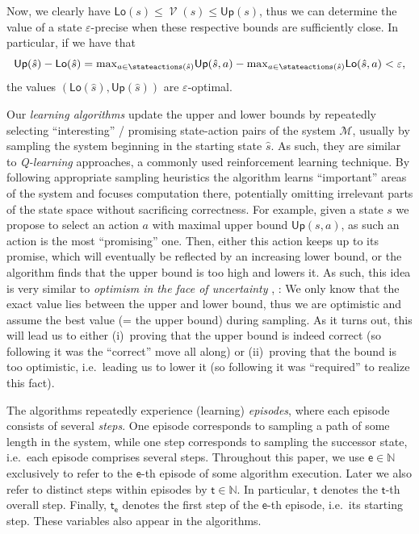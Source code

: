\documentclass{theoretics}
\newcommand{\Naturals}{\mathbb{N}}
\newcommand{\MDP}{\mathcal{M}}
\newcommand{\initialstate}{\hat{s}}
\DeclareMathOperator{\val}{\mathcal{V}}
\newcommand{\upperbound}{\mathsf{Up}}
\newcommand{\lowerbound}{\mathsf{Lo}}
\newcommand{\algostep}{\mathsf{t}}
\newcommand{\algoepisode}{\mathsf{e}}
\begin{document}
Now, we clearly have  $\lowerbound(s) \leq \val(s) \leq \upperbound(s)$, thus we can determine the value of a state $\varepsilon$-precise when these respective bounds are sufficiently close.
In particular, if we have that
\begin{equation*}
	\upperbound(\initialstate) - \lowerbound(\initialstate) = {\max}_{a \in \stateactions(\initialstate)} \upperbound(\initialstate, a) - {\max}_{a \in \stateactions(\initialstate)} \lowerbound(\initialstate, a) < \varepsilon,
\end{equation*}
the values $(\lowerbound(\initialstate), \upperbound(\initialstate))$ are $\varepsilon$-optimal.

Our \emph{learning algorithms} update the upper and lower bounds by repeatedly selecting \enquote{interesting} / promising state-action pairs of the system $\MDP$, usually by sampling the system beginning in the starting state $\initialstate$.
As such, they are similar to \emph{Q-learning} \cite{watkins1992q} approaches, a commonly used reinforcement learning technique.
By following appropriate sampling heuristics the algorithm learns \enquote{important} areas of the system and focuses computation there, potentially omitting irrelevant parts of the state space without sacrificing correctness.
For example, given a state $s$ we propose to select an action $a$ with maximal upper bound $\upperbound(s, a)$, as such an action is the most \enquote{promising} one.
Then, either this action keeps up to its promise, which will eventually be reflected by an increasing lower bound, or the algorithm finds that the upper bound is too high and lowers it.
As such, this idea is very similar to \emph{optimism in the face of uncertainty} \cite[Section~4.2]{DBLP:series/synthesis/2010Szepesvari}, \cite{lai1985asymptotically}:
We only know that the exact value lies between the upper and lower bound, thus we are optimistic and assume the best value (= the upper bound) during sampling.
As it turns out, this will lead us to either (i)~proving that the upper bound is indeed correct (so following it was the \enquote{correct} move all along) or (ii)~proving that the bound is too optimistic, i.e.\ leading us to lower it (so following it was \enquote{required} to realize this fact).

The algorithms repeatedly experience (learning) \emph{episodes}, where each episode consists of several \emph{steps}.
One episode corresponds to sampling a path of some length in the system, while one step corresponds to sampling the successor state, i.e.\ each episode comprises several steps.
Throughout this paper, we use $\algoepisode \in \Naturals$ exclusively to refer to the $\algoepisode$-th episode of some algorithm execution.
Later we also refer to distinct steps within episodes by $\algostep \in \Naturals$.
In particular, $\algostep$ denotes the $\algostep$-th overall step.
Finally, $\algostep_\algoepisode$ denotes the first step of the $\algoepisode$-th episode, i.e.\ its starting step.
These variables also appear in the algorithms.
\end{document}
